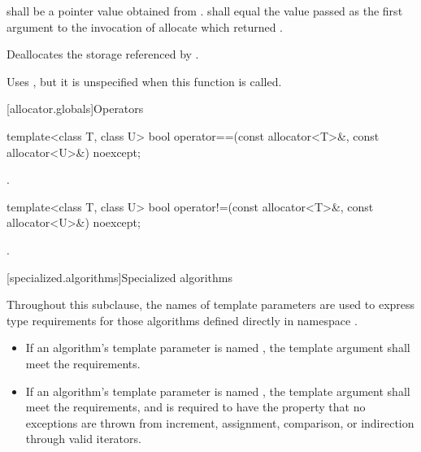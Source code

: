\begin{itemdescr}
\pnum
\requires
{} shall be a pointer value obtained from .
 shall equal the value passed as the first argument
to the invocation of allocate which returned .

\pnum
\effects
Deallocates the storage referenced by  .

\pnum
\remarks
Uses
,
but it is unspecified
when this function is called.
\end{itemdescr}

[allocator.globals]{Operators}

%
\begin{itemdecl}
template<class T, class U>
  bool operator==(const allocator<T>&, const allocator<U>&) noexcept;
\end{itemdecl}

\begin{itemdescr}
\pnum
\returns
{}.
\end{itemdescr}

%
\begin{itemdecl}
template<class T, class U>
  bool operator!=(const allocator<T>&, const allocator<U>&) noexcept;
\end{itemdecl}

\begin{itemdescr}
\pnum
\returns
{}.
\end{itemdescr}

[specialized.algorithms]{Specialized algorithms}

\pnum
Throughout this subclause,
the names of template parameters are used to express type requirements
for those algorithms defined directly in namespace .
\begin{itemize}
\item
If an algorithm's template parameter is named ,
the template argument shall meet the
 requirements.
\item
If an algorithm's template parameter is named ,
the template argument shall meet the
 requirements, and
is required to have the property that no exceptions are thrown
from increment, assignment, comparison, or indirection through valid iterators.
\end{itemize}

